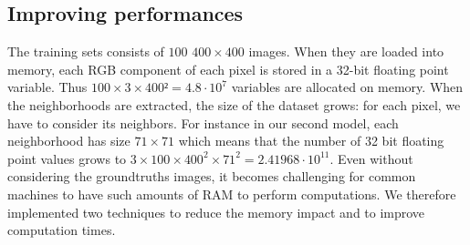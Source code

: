 \documentclass[10pt,conference,compsocconf]{IEEEtran}
\begin{document}
\subsection{Improving performances} \label{perf}
The training sets consists of $100$ $400\times400$ images. When they are loaded into memory, each RGB component of each pixel is stored in a 32-bit floating point variable. Thus $100\times3\times 400² = 4.8 \cdot 10^7$ variables are allocated on memory. When the neighborhoods are extracted, the size of the dataset grows: for each pixel, we have to consider its neighbors. For instance in our second model, each neighborhood has size $71\times71$ which means that the number of 32 bit floating point values grows to $3 \times 100 \times 400^2 \times 71^2 = 2.41968 \cdot 10^{11}$. Even without considering the groundtruths images, it becomes challenging for common machines to have such amounts of RAM to perform computations.
We therefore implemented two techniques to reduce the memory impact and to improve computation times.
\end{document}
